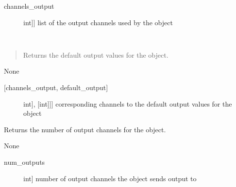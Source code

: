 \documentclass[letterpaper,10pt,english]{sphinxmanual}
\begin{document}
\begin{fulllineitems}
\begin{fulllineitems}
\begin{description}
\item[{channels\_output}] \leavevmode{[}{[}int{]}{]}
\sphinxAtStartPar
list of the output channels used by the object

\end{description}

\end{fulllineitems}


\begin{fulllineitems}
\label{\detokenize{generic:DigitalOutputObject.DigitalOutputObject.get_default_outputs}}~\begin{quote}

\sphinxAtStartPar
Returns the default output values for the object.
\end{quote}

\sphinxAtStartPar
{}

\sphinxAtStartPar
None

\sphinxAtStartPar
{}
\begin{description}
\item[{{[}channels\_output, default\_output{]}}] \leavevmode{[}{[}{[}int{]}, {[}int{]}{]}{]}
\sphinxAtStartPar
corresponding channels to the default output values for the object

\end{description}

\end{fulllineitems}


\begin{fulllineitems}
\label{\detokenize{generic:DigitalOutputObject.DigitalOutputObject.get_num_channels}}
\sphinxAtStartPar
Returns the number of output channels for the object.

\sphinxAtStartPar
{}

\sphinxAtStartPar
None

\sphinxAtStartPar
{}
\begin{description}
\item[{num\_outputs}] \leavevmode{[}int{]}
\sphinxAtStartPar
number of output channels the object sends output to


\end{description}
\end{fulllineitems}
\end{fulllineitems}
\end{document}
